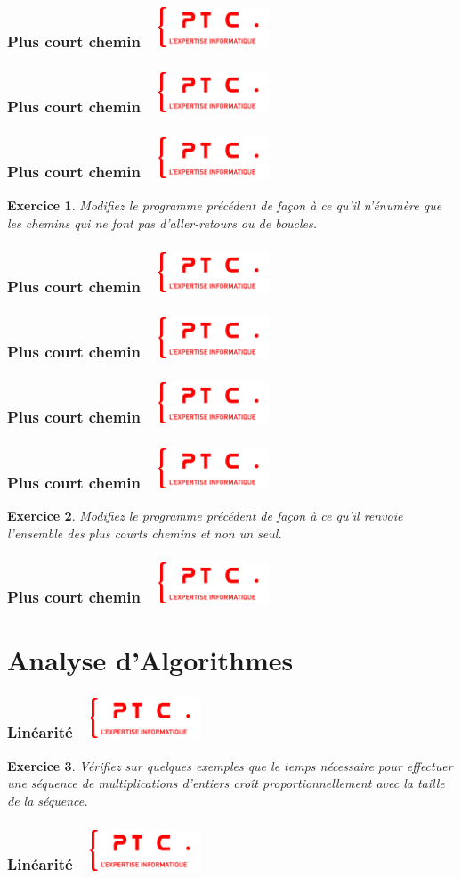 \documentclass[11pt]{beamer}
\newenvironment{slide}[1]{%
\begin{frame}[environment=slide]
\frametitle{#1~\hfill~\includegraphics[height=1.2cm]{./epitech.png}}
}{%
\end{frame}
}
\newtheorem{exercice}{Exercice}
\newcommand{\Python}[1]{
	{\small	}
}
\begin{document}
\begin{slide}{Plus court chemin}
\Python{pcc}
\end{slide}

\begin{slide}{Plus court chemin}
\Python{pcc2}
\end{slide}

\begin{slide}{Plus court chemin}
\begin{exercice}
Modifiez le programme précédent de façon à ce qu'il n'énumère que les chemins qui ne font pas d'aller-retours ou de boucles.
\end{exercice}
\end{slide}

\begin{slide}{Plus court chemin}
\Python{ex19}
\end{slide}

\begin{slide}{Plus court chemin}
\Python{pcf}
\end{slide}

\begin{slide}{Plus court chemin}
\Python{pccd}
\end{slide}

\begin{slide}{Plus court chemin}
\begin{exercice}
Modifiez le programme précédent de façon à ce qu'il renvoie l'ensemble des plus courts chemins et non un seul.
\end{exercice}
\end{slide}

\begin{slide}{Plus court chemin}
\Python{ex19a}
\end{slide}

\section{Analyse d'Algorithmes}


\begin{slide}{Linéarité}
\begin{exercice}
Vérifiez sur quelques exemples que le temps nécessaire pour effectuer une séquence de multiplications d'entiers croît proportionnellement avec la taille de la séquence.\\
\end{exercice}
\end{slide}

\begin{slide}{Linéarité}
\Python{ex19b}
\end{slide}
\end{document}
